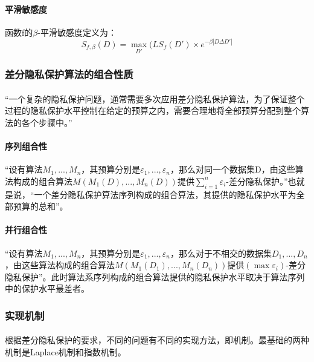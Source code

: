 \documentclass[12pt,a4paper]{article}
\begin{document}
\paragraph{平滑敏感度} 函数f的$\beta$-平滑敏感度定义为：
\begin{equation}
	S_{f,\beta}(D)=\max_{D'}(LS_f(D')\times e^{-\beta |D\Delta D'|}
\end{equation}
\subsubsection{差分隐私保护算法的组合性质}
\paragraph{} “一个复杂的隐私保护问题，通常需要多次应用差分隐私保护算法，为了保证整个过程的隐私保护水平控制在给定的预算之内，需要合理地将全部预算分配到整个算法的各个步骤中。”
\paragraph{序列组合性} “设有算法$M_1,...,M_n$，其预算分别是$\varepsilon_1,...,\varepsilon_n$，那么对同一个数据集D，由这些算法构成的组合算法$M(M_1(D),...,M_n(D))$提供$\sum_{i=1}^n \varepsilon_i$-差分隐私保护。”也就是说，“一个差分隐私保护算法序列构成的组合算法，其提供的隐私保护水平为全部预算的总和”。
\paragraph{并行组合性} “设有算法$M_1,...,M_n$，其预算分别是$\varepsilon_1,...,\varepsilon_n$，那么对于不相交的数据集$D_1,...,D_n$，由这些算法构成的组合算法$M(M_1(D_1),...,M_n(D_n))$提供$(\max \varepsilon_i)$-差分隐私保护”。此时算法系序列构成的组合算法提供的隐私保护水平取决于算法序列中的保护水平最差者。
\subsubsection{实现机制}
\paragraph{} 根据差分隐私保护的要求，不同的问题有不同的实现方法，即机制。最基础的两种机制是Laplace机制和指数机制。
\end{document}
